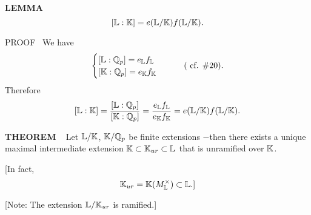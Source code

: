 \begin{x}{\small\bf LEMMA} \ %
\[
[\mathbb{L}:\mathbb{K}] = e(\mathbb{L}/\mathbb{K})f(\mathbb{L}/\mathbb{K}).
\]

\indent PROOF \   We have
\[
\begin{cases}
[\LL:\Q_p ] = e_\LL f_\LL \\
[\K:\Q_p] = e_\K f_\K
\end{cases}
\qquad (\text{ cf. $\# 20$}).
\]
Therefore
\[
[\mathbb{L}:\mathbb{K}] = \frac{[\mathbb{L}:\mathbb{Q}_p] }{[\mathbb{K}:\mathbb{Q}_p]} = \frac{e_{\mathbb{L}} f_{\mathbb{L}}}{e_{\mathbb{K}} f_{\mathbb{K}}} = e(\mathbb{L}/\mathbb{K}) f(\mathbb{L}/\mathbb{K}).
\]
\end{x}

\vspace{0.1cm}

\begin{x}{\small\bf THEOREM} \ %
Let $\mathbb{L}/\mathbb{K}$, $\mathbb{K}/\mathbb{Q}_p$ be finite extensions $-$then there exists a unique maximal intermediate extension 
$\mathbb{K} \subset \mathbb{K}_{ur} \subset \mathbb{L}$ that is unramified over $\mathbb{K}$.

\vspace{0.1cm}

[In fact, 
\[
\mathbb{K}_{ur} = \mathbb{K}(M_{\mathbb{L}}^\times) \subset \mathbb{L}.]
\]

[Note: The extension $\mathbb{L}/\mathbb{K}_{ur}$ is ramified.]
\end{x}






















